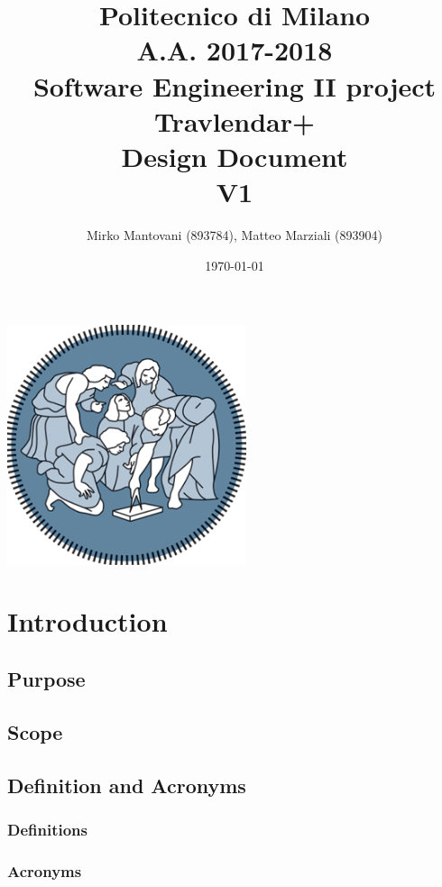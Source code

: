 \documentclass{article}
\author{Mirko Mantovani (893784), Matteo Marziali (893904)}
\date{\today}
\title{Politecnico di Milano
	\\A.A. 2017\@-\@2018
	\\Software Engineering II project \\ \textbf{Travlendar+}
	\\
	\textbf{D}esign \textbf{D}ocument 
	\\
	\textbf{V1}}
\begin{document}
\maketitle
\begin{center}
	\includegraphics[width=7cm]{polimi-logo}
\end{center}
\clearpage
{\hypersetup{hidelinks}\tableofcontents}
\clearpage

\section{Introduction}

\subsection{Purpose}



\subsection{Scope}




\clearpage

\subsection{Definition and Acronyms}

\subsubsection{Definitions}


\subsubsection{Acronyms}

\end{document}

